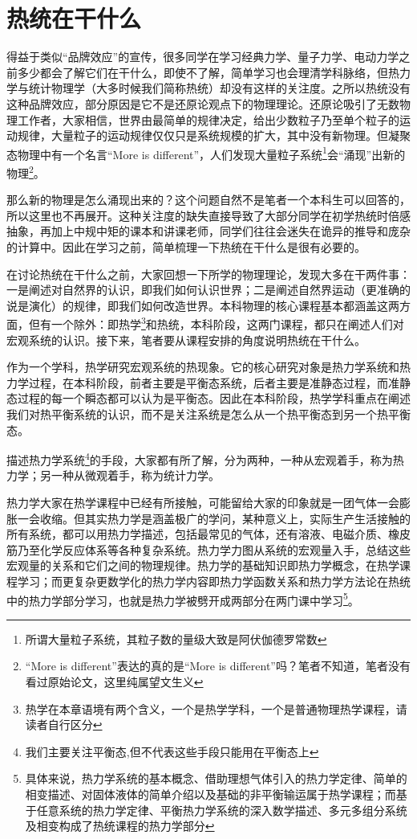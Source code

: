 \documentclass[../../main.tex]{subfiles}
\begin{document}
\chapter{热统在干什么}

得益于类似“品牌效应”的宣传，很多同学在学习经典力学、量子力学、电动力学之前多少都会了解它们在干什么，即使不了解，简单学习也会理清学科脉络，但热力学与统计物理学（大多时候我们简称热统）却没有这样的关注度。之所以热统没有这种品牌效应，部分原因是它不是还原论观点下的物理理论。还原论吸引了无数物理工作者，大家相信，世界由最简单的规律决定，给出少数粒子乃至单个粒子的运动规律，大量粒子的运动规律仅仅只是系统规模的扩大，其中没有新物理。但凝聚态物理中有一个名言“More is different”，人们发现大量粒子系统\footnote{所谓大量粒子系统，其粒子数的量级大致是阿伏伽德罗常数}会“涌现”出新的物理\footnote{“More is different”表达的真的是“More is different”吗？笔者不知道，笔者没有看过原始论文，这里纯属望文生义}。

那么新的物理是怎么涌现出来的？这个问题自然不是笔者一个本科生可以回答的，所以这里也不再展开。这种关注度的缺失直接导致了大部分同学在初学热统时倍感抽象，再加上中规中矩的课本和讲课老师，同学们往往会迷失在诡异的推导和庞杂的计算中。因此在学习之前，简单梳理一下热统在干什么是很有必要的。

在讨论热统在干什么之前，大家回想一下所学的物理理论，发现大多在干两件事：一是阐述对自然界的认识，即我们如何认识世界；二是阐述自然界运动（更准确的说是演化）的规律，即我们如何改造世界。本科物理的核心课程基本都涵盖这两方面，但有一个除外：即热学\footnote{热学在本章语境有两个含义，一个是热学学科，一个是普通物理热学课程，请读者自行区分}和热统，本科阶段，这两门课程，都只在阐述人们对宏观系统的认识。接下来，笔者要从课程安排的角度说明热统在干什么。

作为一个学科，热学研究宏观系统的热现象。它的核心研究对象是热力学系统和热力学过程，在本科阶段，前者主要是平衡态系统，后者主要是准静态过程，而准静态过程的每一个瞬态都可以认为是平衡态。因此在本科阶段，热学学科重点在阐述我们对热平衡系统的认识，而不是关注系统是怎么从一个热平衡态到另一个热平衡态。

描述热力学系统\footnote{我们主要关注平衡态,但不代表这些手段只能用在平衡态上}的手段，大家都有所了解，分为两种，一种从宏观着手，称为热力学；另一种从微观着手，称为统计力学。

热力学大家在热学课程中已经有所接触，可能留给大家的印象就是一团气体一会膨胀一会收缩。但其实热力学是涵盖极广的学问，某种意义上，实际生产生活接触的所有系统，都可以用热力学描述，包括最常见的气体，还有溶液、电磁介质、橡皮筋乃至化学反应体系等各种复杂系统。热力学力图从系统的宏观量入手，总结这些宏观量的关系和它们之间的物理规律。热力学的基础知识即热力学概念，在热学课程学习；而更复杂更数学化的热力学内容即热力学函数关系和热力学方法论在热统中的热力学部分学习，也就是热力学被劈开成两部分在两门课中学习\footnote{具体来说，热力学系统的基本概念、借助理想气体引入的热力学定律、简单的相变描述、对固体液体的简单介绍以及基础的非平衡输运属于热学课程；而基于任意系统的热力学定律、平衡热力学系统的深入数学描述、多元多组分系统及相变构成了热统课程的热力学部分}。
\end{document}
